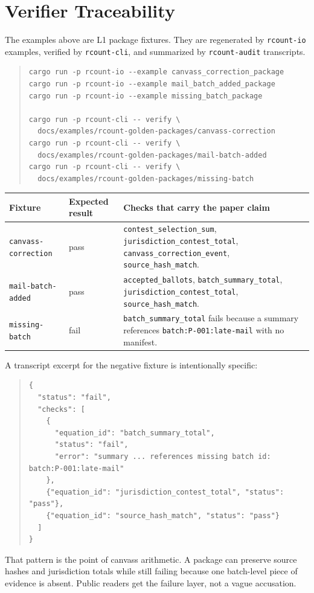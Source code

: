 \section{Verifier Traceability}

The examples above are L1 package fixtures. They are regenerated by
\texttt{rcount-io} examples, verified by \texttt{rcount-cli}, and summarized by
\texttt{rcount-audit} transcripts.

\begin{quote}
\footnotesize
\begin{verbatim}
cargo run -p rcount-io --example canvass_correction_package
cargo run -p rcount-io --example mail_batch_added_package
cargo run -p rcount-io --example missing_batch_package

cargo run -p rcount-cli -- verify \
  docs/examples/rcount-golden-packages/canvass-correction
cargo run -p rcount-cli -- verify \
  docs/examples/rcount-golden-packages/mail-batch-added
cargo run -p rcount-cli -- verify \
  docs/examples/rcount-golden-packages/missing-batch
\end{verbatim}
\end{quote}

\begin{center}
\small
\begin{tabularx}{\textwidth}{lXX}
\toprule
Fixture & Expected result & Checks that carry the paper claim \\
\midrule
\texttt{canvass-correction} & pass & \texttt{contest\_selection\_sum}, \texttt{jurisdiction\_contest\_total}, \texttt{canvass\_correction\_event}, \texttt{source\_hash\_match}. \\
\texttt{mail-batch-added} & pass & \texttt{accepted\_ballots}, \texttt{batch\_summary\_total}, \texttt{jurisdiction\_contest\_total}, \texttt{source\_hash\_match}. \\
\texttt{missing-batch} & fail & \texttt{batch\_summary\_total} fails because a summary references \texttt{batch:P-001:late-mail} with no manifest. \\
\bottomrule
\end{tabularx}
\end{center}

A transcript excerpt for the negative fixture is intentionally specific:
\begin{quote}
\footnotesize
\begin{verbatim}
{
  "status": "fail",
  "checks": [
    {
      "equation_id": "batch_summary_total",
      "status": "fail",
      "error": "summary ... references missing batch id: batch:P-001:late-mail"
    },
    {"equation_id": "jurisdiction_contest_total", "status": "pass"},
    {"equation_id": "source_hash_match", "status": "pass"}
  ]
}
\end{verbatim}
\end{quote}

That pattern is the point of canvass arithmetic. A package can preserve source
hashes and jurisdiction totals while still failing because one batch-level
piece of evidence is absent. Public readers get the failure layer, not a vague
accusation.
